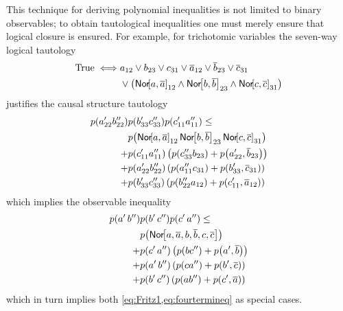 This technique for deriving polynomial inequalities is not limited to binary observables; to obtain tautological inequalities one must merely ensure that logical closure is ensured. For example, for trichotomic variables the seven-way logical tautology
\begin{align*}
\mbox{True}\iff& a_{12} \lor b_{23} \lor c_{31} \lor \ot{a}_{12} \lor \ot{b}_{23} \lor \ot{c}_{31} 
\\&\lor \parens*{\Nor{a,\ot{a}}_{12} \land \Nor{b,\ot{b}}_{23} \land \Nor{c,\ot{c}}_{31}} 
\end{align*}
justifies
%
%
the causal structure tautology
\begin{align}\begin{split}
\p{a'_{22} b''_{22}}&\p{b'_{33} c''_{33}}\p{c'_{11} a''_{11}}\leq
\\ &\p{\Nor{a,\ot{a}}_{12}  \Nor{b,\ot{b}}_{23} \Nor{c,\ot{c}}_{31}}
\\+&\p{c'_{11} a''_{11}}\left(\p{c''_{33} b_{23}}+\p{a'_{22},\ot{b}_{23}}\right)
\\+&\p{a'_{22} b''_{22}}\left(\p{a''_{11} c_{31}}+\p{b'_{33},\ot{c}_{31}}\right)
\\+&\p{b'_{33} c''_{33}}\left(\p{b''_{22} a_{12}}+\p{c'_{11},\ot{a}_{12}}\right)
\end{split}\end{align}
which implies the observable inequality
\begin{align}\begin{split}
\p{a'\, b''}&\p{b'\, c''}\p{c'\, a''}\leq
\\ &\p{\Nor{a,\ot{a},b,\ot{b},c,\ot{c}}}
\\+&\p{c'\, a''}\left(\p{b c''}+\p{a',\ot{b}}\right)
\\+&\p{a'\, b''}\left(\p{c a''}+\p{b',\ot{c}}\right)
\\+&\p{b'\, c''}\left(\p{a b''}+\p{c',\ot{a}}\right)
\end{split}\end{align}
which in turn implies both \cref{eq:Fritz1,eq:fourtermineq} as special cases.

